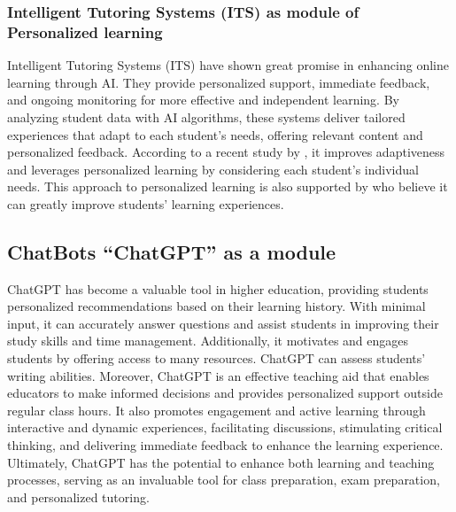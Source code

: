 \subsubsection{Intelligent Tutoring Systems (ITS) as module of Personalized learning}

Intelligent Tutoring Systems (ITS) have shown great promise in enhancing online learning through  AI.
They provide personalized support, immediate feedback, and ongoing monitoring for more effective and independent learning.
By analyzing student data with AI algorithms, these systems deliver tailored experiences that adapt to each student's needs,
offering relevant content and personalized feedback. According to a recent study by \citep{l_d_of_cs_akshara_first_grade_college_2023},
it improves adaptiveness and leverages personalized learning by considering each student's individual needs.
This approach to personalized learning is also supported by \citep{bradac_design_2022} who believe it can greatly
improve students' learning experiences.

\subsection{ChatBots ``ChatGPT'' as a module}

ChatGPT has become a valuable tool in higher education, providing students personalized recommendations
based on their learning history. With minimal input, it can accurately answer questions and assist students
in improving their study skills and time management. Additionally, it motivates and engages students by
offering access to many resources. ChatGPT can assess students' writing abilities\citep{mohammed_exploring_2023}.
Moreover, ChatGPT is an effective teaching aid that enables educators to make informed decisions and provides
personalized support outside regular class hours. It also promotes engagement and active learning through interactive
and dynamic experiences, facilitating discussions, stimulating critical thinking, and delivering immediate feedback
to enhance the learning experience\citep{schonberger_chatgpt_2023}.
Ultimately, ChatGPT has the potential to enhance both learning and teaching processes,
serving as an invaluable tool for class preparation, exam preparation, and personalized tutoring\citep{domenech_chatgpt_2023}.

